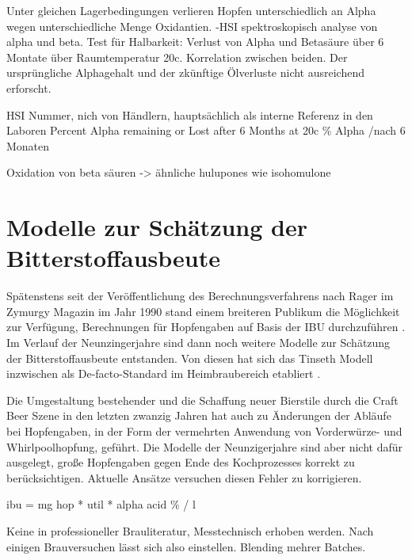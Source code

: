\documentclass[a4paper,parskip=half]{scrartcl}
\begin{document}
\parencite[104]{Garetz1994} 
Unter gleichen Lagerbedingungen verlieren Hopfen unterschiedlich an
Alpha wegen unterschiedliche Menge Oxidantien.
-HSI spektroskopisch analyse von alpha und beta. Test für Halbarkeit:
Verlust von Alpha und Betasäure über 6 Montate über Raumtemperatur 20c.
Korrelation zwischen beiden. Der ursprüngliche Alphagehalt und der
zkünftige
Ölverluste nicht ausreichend erforscht.

\parencite[104]{Garetz1994} 
HSI Nummer, nich von Händlern, hauptsächlich als interne Referenz
in den Laboren
Percent Alpha remaining or Lost after 6 Months at 20c
\% Alpha /nach 6 Monaten



\parencite[52]{Davidson1997}
Oxidation von beta säuren -> ähnliche hulupones wie isohomulone



\section*{Modelle zur Schätzung der Bitterstoffausbeute}

Spätenstens seit der Veröffentlichung des Berechnungsverfahrens nach
Rager im Zymurgy Magazin im Jahr 1990 stand einem breiteren
Publikum die Möglichkeit zur Verfügung, Berechnungen für Hopfengaben auf
Basis der IBU
durchzuführen \parencite[59]{Hall1997}. Im Verlauf der Neunzingerjahre
sind dann noch weitere Modelle zur Schätzung der Bitterstoffausbeute entstanden.
Von diesen hat sich das Tinseth Modell inzwischen als De-facto-Standard im
Heimbraubereich etabliert \parencite[185]{Hieronymus2012}.

Die Umgestaltung bestehender und die Schaffung neuer Bierstile
durch die Craft Beer Szene in den letzten zwanzig Jahren hat auch zu Änderungen
der Abläufe bei Hopfengaben, in der Form der vermehrten Anwendung von Vorderwürze-
und Whirlpoolhopfung, geführt. Die Modelle der Neunzigerjahre sind aber
nicht dafür ausgelegt, große Hopfengaben gegen Ende des Kochprozesses korrekt
zu berücksichtigen. Aktuelle Ansätze versuchen diesen Fehler zu korrigieren.
\parencite[39]{Novotny2018}


\parencite[51]{Holle2010}
ibu = mg hop * util * alpha acid \% / l

\parencite[127]{Garetz1994} 
Keine in professioneller Brauliteratur, Messtechnisch erhoben
werden. Nach einigen Brauversuchen lässt sich also einstellen.
Blending mehrer Batches.
\end{document}
